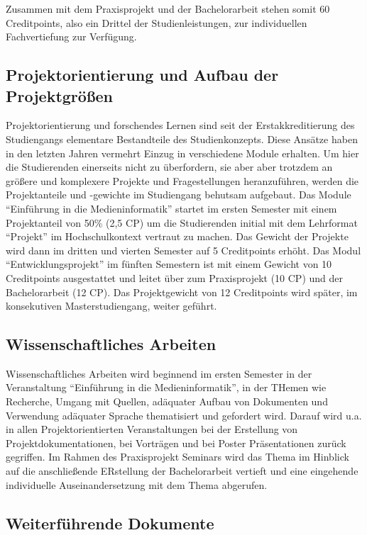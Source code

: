 Zusammen mit dem Praxisprojekt und der Bachelorarbeit stehen somit 60
Creditpoints, also ein Drittel der Studienleistungen, zur individuellen
Fachvertiefung zur Verfügung.

\subsection{Projektorientierung und Aufbau der
Projektgrößen}\label{projektorientierung-und-aufbau-der-projektgruxf6uxdfen}

Projektorientierung und forschendes Lernen sind seit der
Erstakkreditierung des Studiengangs elementare Bestandteile des
Studienkonzepts. Diese Ansätze haben in den letzten Jahren vermehrt
Einzug in verschiedene Module erhalten. Um hier die Studierenden
einerseits nicht zu überfordern, sie aber aber trotzdem an größere und
komplexere Projekte und Fragestellungen heranzuführen, werden die
Projektanteile und -gewichte im Studiengang behutsam aufgebaut. Das
Module ``Einführung in die Medieninformatik'' startet im ersten Semester
mit einem Projektanteil von 50\% (2,5 CP) um die Studierenden initial
mit dem Lehrformat ``Projekt'' im Hochschulkontext vertraut zu machen.
Das Gewicht der Projekte wird dann im dritten und vierten Semester auf 5
Creditpoints erhöht. Das Modul ``Entwicklungsprojekt'' im fünften
Semestern ist mit einem Gewicht von 10 Creditpoints ausgestattet und
leitet über zum Praxisprojekt (10 CP) und der Bachelorarbeit (12 CP).
Das Projektgewicht von 12 Creditpoints wird später, im konsekutiven
Masterstudiengang, weiter geführt.

\subsection{Wissenschaftliches
Arbeiten}\label{wissenschaftliches-arbeiten}

Wissenschaftliches Arbeiten wird beginnend im ersten Semester in der
Veranstaltung ``Einführung in die Medieninformatik'', in der THemen wie
Recherche, Umgang mit Quellen, adäquater Aufbau von Dokumenten und
Verwendung adäquater Sprache thematisiert und gefordert wird. Darauf
wird u.a. in allen Projektorientierten Veranstaltungen bei der
Erstellung von Projektdokumentationen, bei Vorträgen und bei Poster
Präsentationen zurück gegriffen. Im Rahmen des Praxisprojekt Seminars
wird das Thema im Hinblick auf die anschließende ERstellung der
Bachelorarbeit vertieft und eine eingehende individuelle
Auseinandersetzung mit dem Thema abgerufen.

\subsection{Weiterführende
Dokumente}\label{weiterfuxfchrende-dokumente-2}

